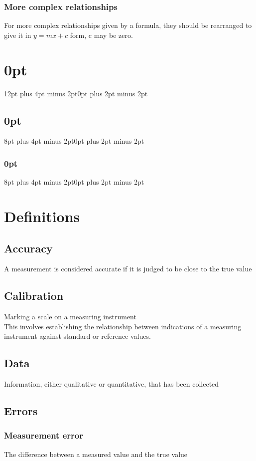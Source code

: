 \documentclass{article}[18pt]
\begin{document}
\subsubsection{More complex relationships}
For more complex relationships given by a formula, they should be rearranged to give it in $y=mx+c$ form, c may be zero.
\newpage
\titlespacing\section{0pt}{12pt plus 4pt minus 2pt}{0pt plus 2pt minus 2pt}
\titlespacing\subsection{0pt}{8pt plus 4pt minus 2pt}{0pt plus 2pt minus 2pt}
\titlespacing\subsubsection{0pt}{8pt plus 4pt minus 2pt}{0pt plus 2pt minus 2pt}
\section{Definitions}
\setcounter{secnumdepth}{0}
\subsection{Accuracy}
A measurement is considered accurate if it is judged to be close to the true value
\subsection{Calibration}
Marking a scale on a measuring instrument\\
This involves establishing the relationship between indications of a measuring instrument against standard or reference values.
\subsection{Data}
Information, either qualitative or quantitative, that has been collected
\subsection{Errors}
\subsubsection{Measurement error}
The difference between a measured value and the true value
\end{document}

